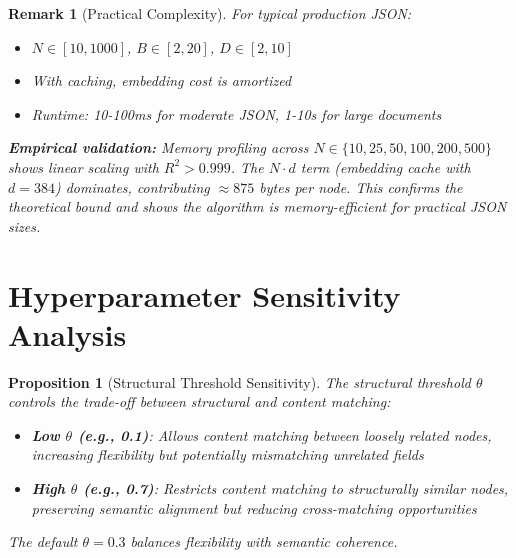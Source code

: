 \documentclass{article}
\newtheorem{proposition}[theorem]{Proposition}
\newtheorem{remark}[theorem]{Remark}
\begin{document}
\begin{remark}[Practical Complexity]
For typical production JSON:
\begin{itemize}
    \item $N \in [10, 1000]$, $B \in [2, 20]$, $D \in [2, 10]$
    \item With caching, embedding cost is amortized
    \item Runtime: 10-100ms for moderate JSON, 1-10s for large documents
\end{itemize}

\textbf{Empirical validation:} Memory profiling across $N \in \{10, 25, 50, 100, 200, 500\}$ shows linear scaling with $R^2 > 0.999$. The $N \cdot d$ term (embedding cache with $d = 384$) dominates, contributing $\approx 875$ bytes per node. This confirms the theoretical bound and shows the algorithm is memory-efficient for practical JSON sizes.
\end{remark}

\section{Hyperparameter Sensitivity Analysis}
\label{sec:ablation}

\begin{proposition}[Structural Threshold Sensitivity]
\label{prop:threshold}
The structural threshold $\theta$ controls the trade-off between structural and content matching:
\begin{itemize}
    \item \textbf{Low $\theta$ (e.g., 0.1)}: Allows content matching between loosely related nodes, increasing flexibility but potentially mismatching unrelated fields
    \item \textbf{High $\theta$ (e.g., 0.7)}: Restricts content matching to structurally similar nodes, preserving semantic alignment but reducing cross-matching opportunities
\end{itemize}
The default $\theta = 0.3$ balances flexibility with semantic coherence.
\end{proposition}
\end{document}
